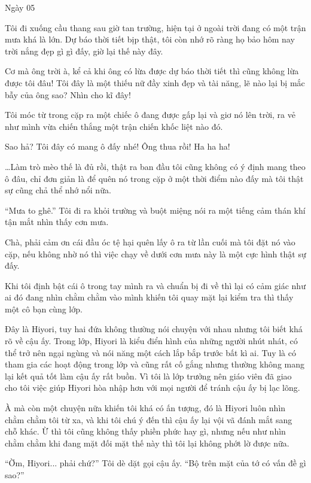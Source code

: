 {Ngày 05}
    {

Tôi đi xuống cầu thang sau giờ tan trường, hiện tại ở ngoài trời đang có
một trận mưa khá là lớn. Dự báo thời tiết bịp thật, tôi còn nhớ rõ ràng
họ bảo hôm nay trời nắng đẹp gì gì đấy, giờ lại thế này đây.

Cơ mà ông trời à, kể cả khi ông có lừa được dự báo thời tiết thì cũng
không lừa được tôi đâu! Tôi đây là một thiếu nữ đầy xinh đẹp và tài
năng, lẽ nào lại bị mắc bẫy của ông sao? Nhìn cho kĩ đây!

Tôi móc từ trong cặp ra một chiếc ô đang được gấp lại và giơ nó lên
trời, ra vẻ như mình vừa chiến thắng một trận chiến khốc liệt nào đó.

Sao hả? Tôi đây có mang ô đấy nhé! Ông thua rồi! Ha ha ha!

\ldots Làm trò mèo thế là đủ rồi, thật ra ban đầu tôi cũng không có ý
định mang theo ô đâu, chỉ đơn giản là để quên nó trong cặp ở một thời
điểm nào đấy mà tôi thật sự cũng chả thể nhớ nổi nữa.

``Mưa to ghê.'' Tôi đi ra khỏi trường và buột miệng nói ra một tiếng cảm
thán khí tận mắt nhìn thấy cơn mưa.

Chà, phải cảm ơn cái đầu óc tệ hại quên lấy ô ra từ lần cuối mà tôi đặt
nó vào cặp, nếu không nhờ nó thì việc chạy về dưới cơn mưa này là một
cực hình thật sự đấy.

Khi tôi định bật cái ô trong tay mình ra và chuẩn bị đi về thì lại có
cảm giác như ai đó đang nhìn chằm chằm vào mình khiến tôi quay mặt lại
kiểm tra thì thấy một cô bạn cùng lớp.

Đây là Hiyori, tuy hai đứa không thường nói chuyện với nhau nhưng tôi
biết khá rõ về cậu ấy. Trong lớp, Hiyori là kiểu điển hình của những
người nhút nhát, có thể trở nên ngại ngùng và nói năng một cách lắp bắp
trước bất kì ai. Tuy là có tham gia các hoạt động trong lớp và cũng rất
cố gắng nhưng thường không mang lại kết quả tốt làm cậu ấy rất buồn. Vì
tôi là lớp trưởng nên giáo viên đã giao cho tôi việc giúp Hiyori hòa
nhập hơn với mọi người để tránh cậu ấy bị lạc lõng.

À mà còn một chuyện nữa khiến tôi khá có ấn tượng, đó là Hiyori luôn
nhìn chằm chằm tôi từ xa, và khi tôi chú ý đến thì cậu ấy lại vội vã
đánh mắt sang chỗ khác. Ừ thì tôi cũng không thấy phiền phức hay gì,
nhưng nếu như nhìn chằm chằm khi đang mặt đối mặt thế này thì tôi lại
không phớt lờ được nữa.

``Ờm, Hiyori... phải chứ?'' Tôi dè dặt gọi cậu ấy. ``Bộ trên mặt của tớ
có vấn đề gì sao?''

}

